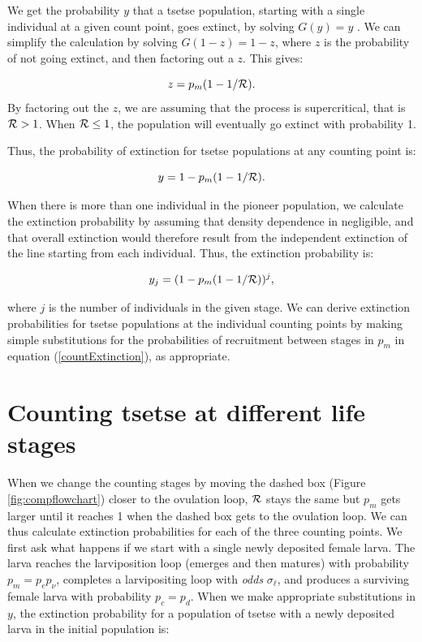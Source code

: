 \documentclass[smallextended]{svjour3}
\begin{document}
	We get the probability $y$ that a tsetse population, starting with a single individual at a given count point, goes extinct, by solving $G(y) = y$ \cite{bartlett1949some}. We can simplify the calculation by solving   $G(1-z) = 1-z$, where $z$ is the probability of not going extinct, and then factoring out a $z$. This gives:
	
	$$ z = p_m(1-1/{\cal R}).$$  
	By factoring out the $z$, we are assuming that the process is supercritical, that is ${\cal R} > 1$. When ${\cal R} \leq 1$, the population will eventually go extinct with probability 1. 
	
	Thus, the probability of extinction for tsetse populations at any counting point is:
	
	\begin{equation}
	\label{countExtinction}	
	y = 1 - p_m(1-1/{\cal R}).	
	\end{equation}
	
	When there is more than one individual in the pioneer population, we calculate the extinction probability by assuming that density dependence in negligible, and that overall extinction would therefore result from the independent extinction of the line starting from each individual. Thus, the extinction probability is:
	
	$$y_j = (1 - p_m(1-1/{\cal R}))^j,$$
	
	where $j$ is the number of individuals in the given stage. We can derive extinction probabilities for tsetse populations at the individual counting points by making simple substitutions for the probabilities of recruitment  between stages in $p_m$  in equation (\ref{countExtinction}), as appropriate. 
	
	\section{Counting tsetse at different life stages}
	
	When we change the counting stages by moving the dashed box (Figure \ref{fig:compflowchart}) closer to the ovulation loop, ${\cal R}$ stays the same but $p_m$ gets larger until it reaches 1 when the dashed box gets to the ovulation loop. We can thus calculate extinction probabilities for each of  the three counting points. We first ask what happens if we start with a single newly deposited female larva.
	The larva reaches the larviposition loop (emerges and then matures) with probability $p_m = p_e p_{\nu}$, completes a larvipositing loop with \textit{odds} $\sigma_\ell$, and produces a surviving female larva with probability $p_c = p_d$. 
	When we make appropriate substitutions in $y$, the extinction probability for a population of tsetse with a newly deposited larva in the initial population is:
	
\end{document}
